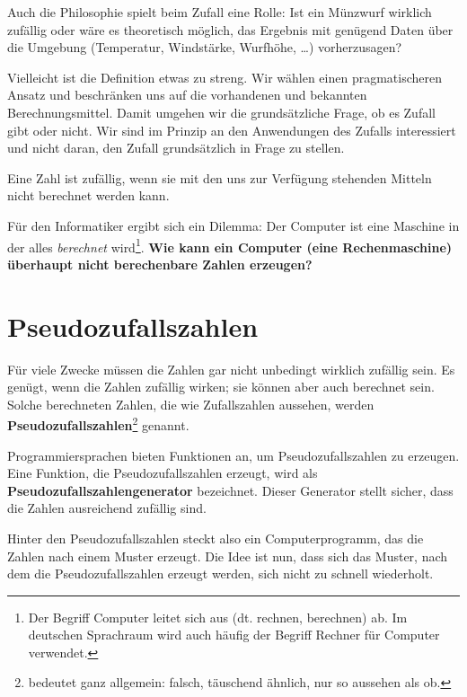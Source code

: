 Auch die Philosophie spielt beim Zufall eine Rolle: Ist ein Münzwurf wirklich zufällig oder wäre es theoretisch möglich, das Ergebnis mit genügend Daten über die Umgebung (Temperatur, Windstärke, Wurfhöhe, \dots) vorherzusagen?

Vielleicht ist die Definition etwas zu streng. Wir wählen einen pragmatischeren Ansatz und beschränken uns auf die vorhandenen und bekannten Berechnungsmittel. Damit umgehen wir die grundsätzliche Frage, ob es Zufall gibt oder nicht. Wir sind im Prinzip an den Anwendungen des Zufalls interessiert und nicht daran, den Zufall grundsätzlich in Frage zu stellen.

\begin{definition}
Eine Zahl ist zufällig, wenn sie mit den uns zur Verfügung stehenden Mitteln nicht berechnet werden kann.
\end{definition}

Für den Informatiker ergibt sich ein Dilemma: Der Computer ist eine Maschine in der alles \textit{berechnet} wird\footnote{Der Begriff Computer leitet sich aus  (dt. rechnen, berechnen) ab. Im deutschen Sprachraum wird auch häufig der Begriff Rechner für Computer verwendet.}. \textbf{Wie kann ein Computer (eine Rechenmaschine) überhaupt nicht berechenbare Zahlen erzeugen?}

\section{Pseudozufallszahlen}

Für viele Zwecke müssen die Zahlen gar nicht unbedingt wirklich zufällig sein. Es genügt, wenn die Zahlen zufällig wirken; sie können aber auch berechnet sein. Solche berechneten Zahlen, die wie Zufallszahlen aussehen, werden \textbf{Pseudozufallszahlen}\footnote{ bedeutet ganz allgemein: falsch, täuschend ähnlich, nur so aussehen als ob.} genannt.\\

\begin{definition}[Pseudozufallszahlengenerator]
Programmiersprachen bieten Funktionen an, um Pseudozufallszahlen zu erzeugen. Eine Funktion, die Pseudozufallszahlen erzeugt, wird als \textbf{Pseudozufallszahlengenerator} bezeichnet. Dieser Generator stellt sicher, dass die Zahlen ausreichend zufällig sind.
\end{definition}

Hinter den Pseudozufallszahlen steckt also ein Computerprogramm, das die Zahlen nach einem Muster erzeugt. Die Idee ist nun, dass sich das Muster, nach dem die Pseudozufallszahlen erzeugt werden, sich nicht zu schnell wiederholt.

